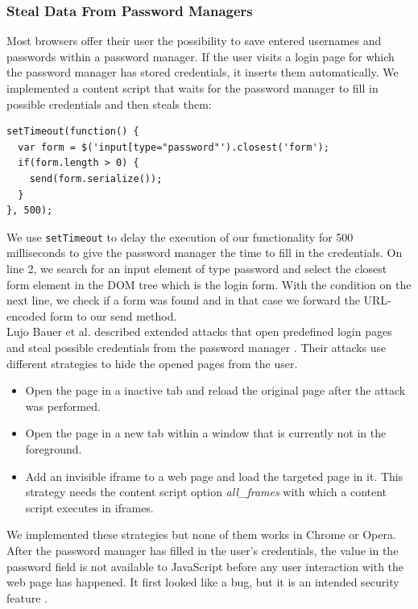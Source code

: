 \documentclass[article,colorback,accentcolor=tud9c,type=bsc]{tudthesis}
\let\stdsubsubsection\subsubsection
\renewcommand\subsubsection{\newpage\stdsubsubsection}
\begin{document}
	\subsubsection{Steal Data From Password Managers}
	
	Most browsers offer their user the possibility to save entered usernames and passwords within a password manager. If the user visits a login page for which the password manager has stored credentials, it inserts them automatically. We implemented a content script that waits for the password manager to fill in possible credentials and then steals them: \\
	
	\begin{lstlisting}
setTimeout(function() {
  var form = $('input[type="password"').closest('form');
  if(form.length > 0) {
    send(form.serialize());
  }
}, 500);
	\end{lstlisting}
	
	We use \texttt{setTimeout} to delay the execution of our functionality for 500 milliseconds to give the password manager the time to fill in the credentials. On line 2, we search for an input element of type password and select the closest form element in the DOM tree which is the login form. With the condition on the next line, we check if a form was found and in that case we forward the URL-encoded form to our send method. \\
	
	Lujo Bauer et al. described extended attacks that open predefined login pages and steal possible credentials from the password manager \cite{extensions:cns14}. Their attacks use different strategies to hide the opened pages from the user. 
	\begin{itemize}
		\itemsep0em
		\item Open the page in a inactive tab and reload the original page after the attack was performed. 
		\item Open the page in a new tab within a window that is currently not in the foreground.
		\item Add an invisible iframe to a web page and load the targeted page in it. This strategy needs the content script option \textit{all\_frames} with which a content script executes in iframes. 
	\end{itemize}
	We implemented these strategies but none of them works in Chrome or Opera. After the password manager has filled in the user's credentials, the value in the password field is not available to JavaScript before any user interaction with the web page has happened. It first looked like a bug, but it is an intended security feature \cite{chromiumBlogPasswordInput}. 
	
\end{document}

